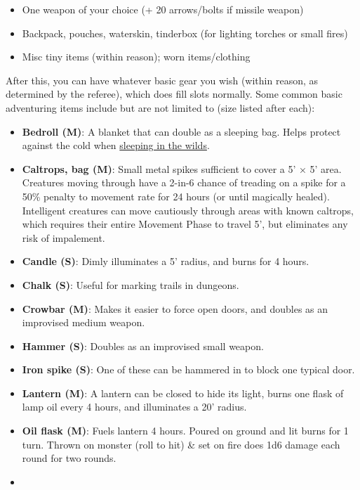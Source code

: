\documentclass{article}
\begin{document}
\begin{multicols}{2}
\begin{itemize}
\tightlist
\item
  One weapon of your choice (+ 20 arrows/bolts if missile weapon)
\item
  Backpack, pouches, waterskin, tinderbox (for lighting torches or small
  fires)
\item
  Misc tiny items (within reason); worn items/clothing
\end{itemize}

After this, you can have whatever basic gear you wish (within reason, as
determined by the referee), which does fill slots normally. Some common
basic adventuring items include but are not limited to (size listed
after each):

\begin{itemize}
\tightlist
\item
  \textbf{Bedroll (M)}: A blanket that can double as a sleeping bag.
  Helps protect against the cold when
  \hyperref[sleeping-in-the-wilds]{sleeping in the wilds}.
\item
  \textbf{Caltrops, bag (M)}: Small metal spikes sufficient to cover a
  5' × 5' area. Creatures moving through have a 2-in-6 chance of
  treading on a spike for a 50\% penalty to movement rate for 24 hours
  (or until magically healed). Intelligent creatures can move cautiously
  through areas with known caltrops, which requires their entire
  Movement Phase to travel 5', but eliminates any risk of impalement.
\item
  \textbf{Candle (S)}: Dimly illuminates a 5' radius, and burns for 4
  hours.
\item
  \textbf{Chalk (S)}: Useful for marking trails in dungeons.
\item
  \textbf{Crowbar (M)}: Makes it easier to force open doors, and doubles
  as an improvised medium weapon.
\item
  \textbf{Hammer (S)}: Doubles as an improvised small weapon.
\item
  \textbf{Iron spike (S)}: One of these can be hammered in to block one
  typical door.
\item
  \textbf{Lantern (M)}: A lantern can be closed to hide its light, burns
  one flask of lamp oil every 4 hours, and illuminates a 20' radius.
\item
  \textbf{Oil flask (M)}: Fuels lantern 4 hours. Poured on ground and
  lit burns for 1 turn. Thrown on monster (roll to hit) \& set on fire
  does 1d6 damage each round for two rounds.
\item

\end{itemize}
\end{multicols}
\end{document}
